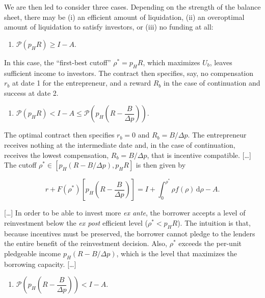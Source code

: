 \documentclass[11pt,a4paper]{article}
\providecommand{\tightlist}{\setlength{\itemsep}{0pt}\setlength{\parskip}{0pt}}
\begin{document}
We are then led to consider three cases. Depending on the strength of the balance sheet, there may
be (i) an efficient amount of liquidation, (ii) an overoptimal amount of liquidation to satisfy
investors, or (iii) no funding at all:

\begin{enumerate}
\def\labelenumi{(\roman{enumi})}
\tightlist
\item
  \(\mathcal{P}(p_HR) \geqslant I - A\).
\end{enumerate}

In this case, the ``first-best cutoff'' \(\rho^* = p_HR\), which maximizes \(U_b\), leaves
sufficient income to investors. The contract then specifies, say, no compensation \(r_b\) at date 1
for the entrepreneur, and a reward \(R_b\) in the case of continuation and success at date 2.

\begin{enumerate}
\def\labelenumi{(\roman{enumi})}
\setcounter{enumi}{1}
\tightlist
\item
  \(\mathcal{P}(p_HR) < I - A \leqslant \mathcal{P}\left(p_H\left(R - \dfrac{B}{\Delta p}\right)\right)\).
\end{enumerate}

The optimal contract then specifies \(r_b = 0\) and \(R_b = B/\Delta p\). The entrepreneur receives
nothing at the intermediate date and, in the case of continuation, receives the lowest compensation,
\(R_b = B/\Delta p\), that is incentive compatible. {[}\ldots{]} The cutoff
\(\rho^* \in [p_H(R - B/\Delta p), p_HR]\) is then given by

\[r + F(\rho^*)\left[p_H\left(R - \frac{B}{\Delta p}\right)\right] = I + \int_0^{\rho^*}\rho f(\rho)\,\mathrm{d}\rho - A.\]

{[}\ldots{]} In order to be able to invest more \emph{ex ante}, the borrower accepts a level of
reinvestment below the \emph{ex post} efficient level (\(\rho^* < p_HR\)). The intuition is that,
because incentives must be preserved, the borrower cannot pledge to the lenders the entire benefit
of the reinvestment decision. Also, \(\rho^*\) exceeds the per-unit pledgeable income
\(p_H(R - B/\Delta p)\), which is the level that maximizes the borrowing capacity. {[}\ldots{]}

\begin{enumerate}
\def\labelenumi{(\roman{enumi})}
\setcounter{enumi}{2}
\tightlist
\item
  \(\mathcal{P}\left(p_H\left(R - \dfrac{B}{\Delta p}\right)\right) < I - A\).
\end{enumerate}
\end{document}
